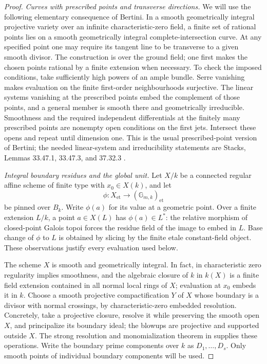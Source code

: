 \begin{proof}
\emph{Curves with prescribed points and transverse directions.}
We will use the following elementary consequence of Bertini. In a
smooth geometrically integral projective variety over an infinite
characteristic-zero field, a finite set of rational points lies on a
smooth geometrically integral complete-intersection curve. At any
specified point one may require its tangent line to be transverse to
a given smooth divisor. The construction is over the ground field;
one first makes the chosen points rational by a finite extension when
necessary. To check the imposed conditions, take sufficiently high
powers of an ample bundle. Serre vanishing makes evaluation on the
finite first-order neighbourhoods surjective. The linear systems
vanishing at the prescribed points embed the complement of those
points, and a general member is smooth there and geometrically
irreducible. Smoothness and the required independent differentials at
the finitely many prescribed points are nonempty open conditions on
the first jets. Intersect these opens and repeat until dimension one.
This is the usual prescribed-point version of Bertini; the needed
linear-system and irreducibility statements are Stacks, Lemmas
33.47.1, 33.47.3, and 37.32.3 \cite{FA_StacksBertini}.

\emph{Integral boundary residues and the global unit.}
Let $X/k$ be a connected regular affine scheme of finite type with
$x_0\in X(k)$, and let
\[
       \phi:X_{\mathrm{et}}\longrightarrow
                        (\mathbb G_{m,k})_{\mathrm{et}}
\]
be pinned over $B_k$. Write $\phi(a)$ for its value at a geometric
point. Over a finite extension $L/k$, a point $a\in X(L)$ has
$\phi(a)\in L^*$: the relative morphism of closed-point Galois topoi
forces the residue field of the image to embed in $L$. Base change of
$\phi$ to $L$ is obtained by slicing by the finite etale constant-field
object. These observations justify every evaluation used below.

The scheme $X$ is smooth and geometrically integral. In fact, in
characteristic zero regularity implies smoothness, and the algebraic
closure of $k$ in $k(X)$ is a finite field extension contained in all
normal local rings of $X$; evaluation at $x_0$ embeds it in $k$.
Choose a smooth projective compactification $Y$ of $X$ whose boundary
is a divisor with normal crossings, by characteristic-zero embedded
resolution. Concretely, take a projective closure, resolve it while
preserving the smooth open $X$, and principalize its boundary ideal;
the blowups are projective and supported outside $X$. The strong
resolution and monomialization theorem in
\cite[``The result'' and ``Idea of proof'', pp.~1--3]{FA_EncinasHauser2002}
supplies these operations. Write the boundary prime components over
$k$ as $D_1,\ldots,D_s$.
Only smooth points of individual boundary components will be used.


\end{proof}
